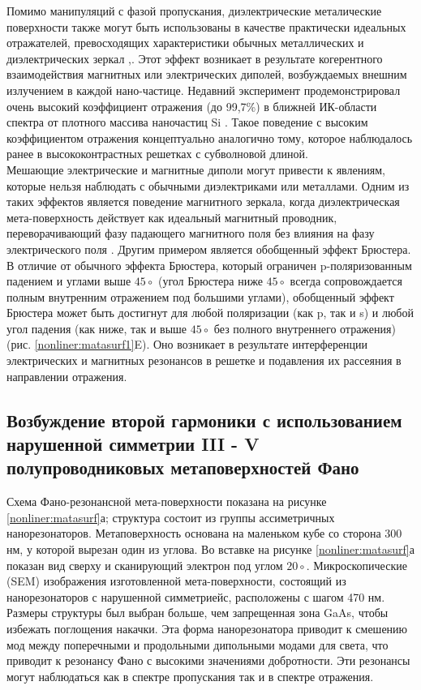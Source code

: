 Помимо манипуляций с фазой пропускания, диэлектрические металические поверхности также могут быть использованы в качестве практически идеальных отражателей, превосходящих характеристики обычных металлических и диэлектрических зеркал \cite{moitra2015large},\cite{nearRefcLayer}.  Этот эффект возникает в результате когерентного взаимодействия магнитных или электрических диполей, возбуждаемых внешним излучением в каждой нано-частице. Недавний эксперимент продемонстрировал очень высокий коэффициент отражения (до 99,7\%) в ближней ИК-области спектра от плотного массива наночастиц Si \cite{moitra2015large}. Такое поведение с высоким коэффициентом отражения концептуально аналогично тому, которое наблюдалось ранее в высококонтрастных решетках с субволновой длиной. 
\\
\hspace*{2mm}
Мешающие электрические и магнитные диполи могут привести к явлениям, которые нельзя наблюдать с обычными диэлектриками или металлами. Одним из таких эффектов является поведение магнитного зеркала, когда диэлектрическая мета-поверхность действует как идеальный магнитный проводник, переворачивающий фазу падающего магнитного поля без влияния на фазу электрического поля \cite{optMagnMirr}. Другим примером является обобщенный эффект Брюстера. В отличие от обычного эффекта Брюстера, который ограничен p-поляризованным падением и углами выше $45\circ$ (угол Брюстера ниже $45\circ$ всегда сопровождается полным внутренним отражением под большими углами), обобщенный эффект Брюстера может быть достигнут для любой поляризации (как p, так и s) и любой угол падения (как ниже, так и выше $45\circ$ без полного внутреннего отражения) (рис. \ref{nonliner:matasurf1}E). Оно возникает в результате интерференции электрических и магнитных резонансов в решетке и подавления их рассеяния в направлении отражения.

\subsection*{Возбуждение второй гармоники с использованием нарушенной симметрии III - V полупроводниковых метаповерхностей Фано}
\hspace*{2mm}
Схема Фано-резонансной мета-поверхности показана на рисунке  \ref{nonliner:matasurf}а; структура состоит из группы ассиметричных  нанорезонаторов. Метаповерхность основана на маленьком кубе со сторона 300 нм, у которой вырезан один из углова. Во вставке на рисунке  \ref{nonliner:matasurf}а показан вид сверху и сканирующий электрон под углом $20\circ$. Микроскопические (SEM) изображения изготовленной мета-поверхности, состоящий из нанорезонаторов с нарушенной симметриейс, расположены с шагом 470 нм. Размеры структуры был выбран больше, чем запрещенная зона GaAs, чтобы избежать поглощения накачки. Эта форма нанорезонатора приводит к смешению мод между поперечными и продольными дипольными модами для света, что приводит к резонансу Фано с высокими значениями добротности. Эти резонансы могут наблюдаться как в спектре  пропускания так и в спектре отражения.

